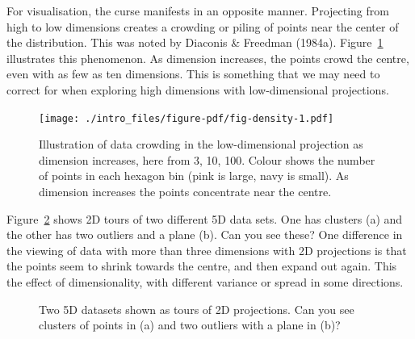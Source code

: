 \documentclass[
  letterpaper,
]{book}
\begin{document}
For visualisation, the curse manifests in an opposite manner. Projecting
from high to low dimensions creates a crowding or piling of points near
the center of the distribution. This was noted by Diaconis \& Freedman
(1984a). Figure~\ref{fig-density} illustrates this phenomenon. As
dimension increases, the points crowd the centre, even with as few as
ten dimensions. This is something that we may need to correct for when
exploring high dimensions with low-dimensional projections.

\begin{figure}

{\centering \texttt{[image: ./intro\_files/figure-pdf/fig-density-1.pdf]}

}

\caption{\label{fig-density}Illustration of data crowding in the
low-dimensional projection as dimension increases, here from 3, 10, 100.
Colour shows the number of points in each hexagon bin (pink is large,
navy is small). As dimension increases the points concentrate near the
centre.}

\end{figure}

Figure~\ref{fig-tour-intro} shows 2D tours of two different 5D data
sets. One has clusters (a) and the other has two outliers and a plane
(b). Can you see these? One difference in the viewing of data with more
than three dimensions with 2D projections is that the points seem to
shrink towards the centre, and then expand out again. This the effect of
dimensionality, with different variance or spread in some directions.

\begin{figure}

\begin{minipage}[t]{0.50\linewidth}

{\centering 

}

\end{minipage}%
%
\begin{minipage}[t]{0.50\linewidth}

{\centering 

}

\end{minipage}%

\caption{\label{fig-tour-intro}Two 5D datasets shown as tours of 2D
projections. Can you see clusters of points in (a) and two outliers with
a plane in (b)?}

\end{figure}
\end{document}

